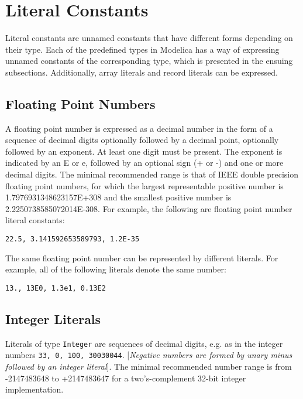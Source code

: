 \section{Literal Constants}

Literal constants are unnamed constants that have different forms
depending on their type. Each of the predefined types in Modelica has a
way of expressing unnamed constants of the corresponding type, which is
presented in the ensuing subsections. Additionally, array literals and
record literals can be expressed.

\subsection{Floating Point Numbers}

A floating point number is expressed as a decimal number in the form of
a sequence of decimal digits optionally followed by a decimal point,
optionally followed by an exponent. At least one digit must be present.
The exponent is indicated by an E or e, followed by an optional sign (+
or -) and one or more decimal digits. The minimal recommended range is
that of IEEE double precision floating point numbers, for which the
largest representable positive number is 1.7976931348623157E+308 and the
smallest positive number is 2.2250738585072014E-308. For example, the
following are floating point number literal constants:

\begin{lstlisting}[language=modelica]
22.5, 3.141592653589793, 1.2E-35
\end{lstlisting}

The same floating point number can be represented by different literals.
For example, all of the following literals denote the same number:

\begin{lstlisting}[language=modelica]
13., 13E0, 1.3e1, 0.13E2
\end{lstlisting}

\subsection{Integer Literals}

Literals of type \lstinline[basicstyle=\ttfamily]!Integer! are sequences of decimal digits, e.g. as in the
integer numbers \lstinline[basicstyle=\ttfamily]!33, 0, 100, 30030044!. {[}\emph{Negative numbers are
formed by unary minus followed by an integer literal}{]}. The minimal
recommended number range is from -2147483648 to +2147483647 for a
two's-complement 32-bit integer implementation.

